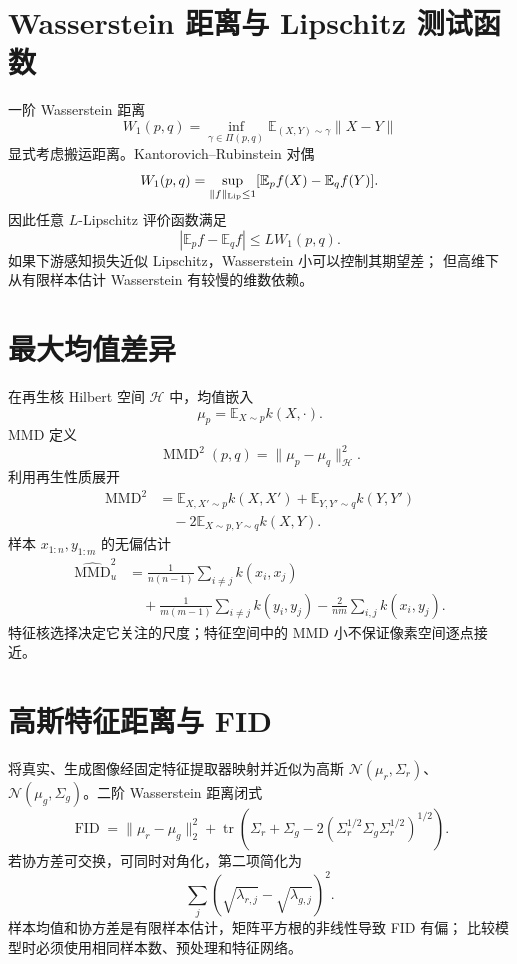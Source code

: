 \documentclass[11pt]{article}
\numberwithin{equation}{section}
\newcommand{\E}{\mathbb{E}}
\newcommand{\1}{\mathbf{1}}
\newcommand{\cN}{\mathcal{N}}
\newcommand{\tr}{\operatorname{tr}}
\begin{document}
\section{Wasserstein 距离与 Lipschitz 测试函数}

一阶 Wasserstein 距离
\begin{equation}
 W_1(p,q)=\inf_{\gamma\in\Pi(p,q)}
 \E_{(X,Y)\sim\gamma}\|X-Y\|
\end{equation}
显式考虑搬运距离。Kantorovich--Rubinstein 对偶
\begin{equation}
 W_1(p,q)=\sup_{\|f\|_{\rm Lip}\le1}
 [\E_pf(X)-\E_qf(Y)].
\end{equation}
因此任意 $L$-Lipschitz 评价函数满足
\begin{equation}
 |\E_pf-\E_qf|\le L W_1(p,q).
\end{equation}
如果下游感知损失近似 Lipschitz，Wasserstein 小可以控制其期望差；
但高维下从有限样本估计 Wasserstein 有较慢的维数依赖。

\section{最大均值差异}

在再生核 Hilbert 空间 $\mathcal H$ 中，均值嵌入
\begin{equation}
 \mu_p=\E_{X\sim p}k(X,\cdot).
\end{equation}
MMD 定义
\begin{equation}
 \operatorname{MMD}^2(p,q)=\|\mu_p-\mu_q\|_{\mathcal H}^2.
\end{equation}
利用再生性质展开
\begin{align}
 \operatorname{MMD}^2
 &=\E_{X,X'\sim p}k(X,X')
 +\E_{Y,Y'\sim q}k(Y,Y')\\
 &\quad-2\E_{X\sim p,Y\sim q}k(X,Y).
\end{align}
样本 $x_{1:n},y_{1:m}$ 的无偏估计
\begin{align}
 \widehat{\operatorname{MMD}}_u^2
 &=\frac1{n(n-1)}\sum_{i\ne j}k(x_i,x_j)\\
 &\quad+\frac1{m(m-1)}\sum_{i\ne j}k(y_i,y_j)
 -\frac2{nm}\sum_{i,j}k(x_i,y_j).
\end{align}
特征核选择决定它关注的尺度；特征空间中的 MMD 小不保证像素空间逐点接近。

\section{高斯特征距离与 FID}

将真实、生成图像经固定特征提取器映射并近似为高斯
$\cN(\mu_r,\Sigma_r)$、$\cN(\mu_g,\Sigma_g)$。二阶 Wasserstein 距离闭式
\begin{equation}
 \operatorname{FID}=
 \|\mu_r-\mu_g\|_2^2
 +\tr\left(\Sigma_r+\Sigma_g
 -2(\Sigma_r^{1/2}\Sigma_g\Sigma_r^{1/2})^{1/2}\right).
\end{equation}
若协方差可交换，可同时对角化，第二项简化为
\begin{equation}
 \sum_j(\sqrt{\lambda_{r,j}}-\sqrt{\lambda_{g,j}})^2.
\end{equation}
样本均值和协方差是有限样本估计，矩阵平方根的非线性导致 FID 有偏；
比较模型时必须使用相同样本数、预处理和特征网络。
\end{document}
